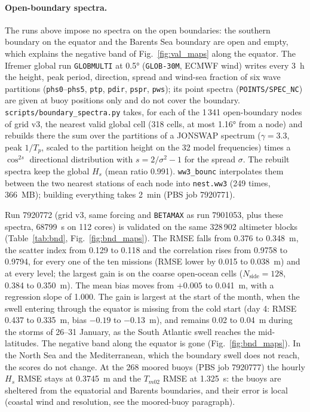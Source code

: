 \documentclass[11pt,a4paper]{article}
\newcommand{\nside}{N_{\mathrm{side}}}
\begin{document}
\paragraph{Open-boundary spectra.} The runs above impose no spectra on the
open boundaries: the southern boundary on the equator and the Barents Sea
boundary are open and empty, which explains the negative band of
Fig.~\ref{fig:val_maps} along the equator. The Ifremer global run
\texttt{GLOBMULTI} at \ang{0.5} (\texttt{GLOB-30M}, ECMWF wind) writes
every \SI{3}{h} the height, peak period, direction, spread and wind-sea
fraction of six wave partitions (\texttt{phs0}--\texttt{phs5},
\texttt{ptp}, \texttt{pdir}, \texttt{pspr}, \texttt{pws}); its point
spectra (\texttt{POINTS/SPEC\_NC}) are given at buoy positions only and do
not cover the boundary. \texttt{scripts/boundary\_spectra.py} takes, for
each of the 1\,341 open-boundary nodes of grid v3, the nearest valid
global cell (318 cells, at most \ang{1.16} from a node) and rebuilds there
the sum over the partitions of a JONSWAP spectrum ($\gamma=3.3$, peak
$1/T_p$, scaled to the partition height on the 32 model frequencies) times
a $\cos^{2s}$ directional distribution with $s=2/\sigma^2-1$ for the spread
$\sigma$. The rebuilt spectra keep the global $H_s$ (mean ratio 0.991).
\texttt{ww3\_bounc} interpolates them between the two nearest stations of
each node into \texttt{nest.ww3} (249 times, \SI{366}{MB}); building
everything takes \SI{2}{min} (PBS job 7920771).

Run 7920772 (grid v3, same forcing and \texttt{BETAMAX} as run 7901053,
plus these spectra, \SI{68799}{s} on 112 cores) is validated on the same
328\,902 altimeter blocks (Table~\ref{tab:bnd}, Fig.~\ref{fig:bnd_maps}).
The RMSE falls from 0.376 to \SI{0.348}{m}, the scatter index from 0.129
to 0.118 and the correlation rises from 0.9758 to 0.9794, for every one
of the ten missions (RMSE lower by 0.015 to \SI{0.038}{m}) and at every
level; the largest gain is on the coarse open-ocean cells ($\nside=128$,
0.384 to \SI{0.350}{m}). The mean bias moves from $+0.005$ to
\SI{+0.041}{m}, with a regression slope of 1.000. The gain is largest at
the start of the month, when the swell entering through the equator is
missing from the cold start (day 4: RMSE 0.437 to \SI{0.335}{m}, bias
$-0.19$ to \SI{-0.13}{m}), and remains 0.02 to \SI{0.04}{m} during the
storms of 26--31 January, as the South Atlantic swell reaches the
mid-latitudes. The negative band along the equator is gone
(Fig.~\ref{fig:bnd_maps}). In the North Sea and the Mediterranean, which
the boundary swell does not reach, the scores do not change. At the 268
moored buoys (PBS job 7920777) the hourly $H_s$ RMSE stays at
\SI{0.3745}{m} and the $T_{m02}$ RMSE at \SI{1.325}{s}: the buoys are
sheltered from the equatorial and Barents boundaries, and their error is
local (coastal wind and resolution, see the moored-buoy paragraph).
\end{document}
